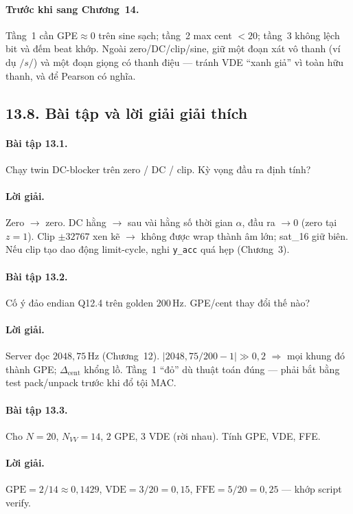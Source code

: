\paragraph{Trước khi sang Chương~14.} Tầng~1 cần GPE$\approx 0$ trên sine sạch; tầng~2 max cent $<20$; tầng~3 không lệch bit và đếm beat khớp. Ngoài zero/DC/clip/sine, giữ một đoạn xát vô thanh (ví dụ $/s/$) và một đoạn giọng có thanh điệu --- tránh VDE ``xanh giả'' vì toàn hữu thanh, và để Pearson có nghĩa.


\subsection*{13.8. Bài tập và lời giải giải thích}

\paragraph{Bài tập 13.1.} Chạy twin DC-blocker trên zero / DC / clip. Kỳ vọng đầu ra định tính?

\paragraph{Lời giải.} Zero $\to$ zero. DC hằng $\to$ sau vài hằng số thời gian $\alpha$, đầu ra $\to 0$ (zero tại $z=1$). Clip $\pm 32767$ xen kẽ $\to$ không được wrap thành âm lớn; sat\_16 giữ biên. Nếu clip tạo dao động limit-cycle, nghi \texttt{y\_acc} quá hẹp (Chương~3).

\paragraph{Bài tập 13.2.} Cố ý đảo endian Q12.4 trên golden $200\,\text{Hz}$. GPE/cent thay đổi thế nào?

\paragraph{Lời giải.} Server đọc $2048{,}75\,\text{Hz}$ (Chương~12). $|2048{,}75/200-1|\gg 0{,}2$ $\Rightarrow$ mọi khung đó thành GPE; $\Delta_{\mathrm{cent}}$ khổng lồ. Tầng~1 ``đỏ'' dù thuật toán đúng --- phải bắt bằng test pack/unpack trước khi đổ tội MAC.

\paragraph{Bài tập 13.3.} Cho $N=20$, $N_{VV}=14$, $2$ GPE, $3$ VDE (rời nhau). Tính GPE, VDE, FFE.

\paragraph{Lời giải.} $\mathrm{GPE}=2/14\approx 0{,}1429$, $\mathrm{VDE}=3/20=0{,}15$, $\mathrm{FFE}=5/20=0{,}25$ --- khớp script verify.
